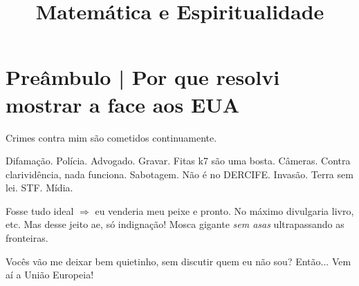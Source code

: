 \documentclass[12pt,a4paper]{article}
\title{Matem\'atica e Espiritualidade}
\date{}
\begin{document}
	\maketitle

	\tableofcontents
	\addtocontents{}{\protect\rule{\textwidth}{.2pt}\par}

	\section{Pre\^ambulo | Por que resolvi mostrar a face aos EUA}
			\begin{flushright}
			\end{flushright}

		Crimes contra mim s\~ao cometidos continuamente.

		Difama\c{c}\~ao. Pol\'icia. Advogado. Gravar. Fitas k7 s\~ao uma bosta. C\^ameras. Contra clarivid\^encia, nada funciona. Sabotagem. N\~ao \'e no DERCIFE. Invas\~ao. Terra sem lei. STF. M\'idia.

		Fosse tudo ideal $ \Rightarrow $ eu venderia meu peixe e pronto. No m\'aximo divulgaria livro, etc. Mas desse jeito ae, s\'o indigna\c{c}\~ao! Mosca gigante \emph{sem asas} ultrapassando as fronteiras\cite{x}.%

		Voc\^es v\~ao me deixar bem quietinho, sem discutir quem eu n\~ao sou? Ent\~ao... Vem a\'i a Uni\~ao Europeia!
\end{document}

